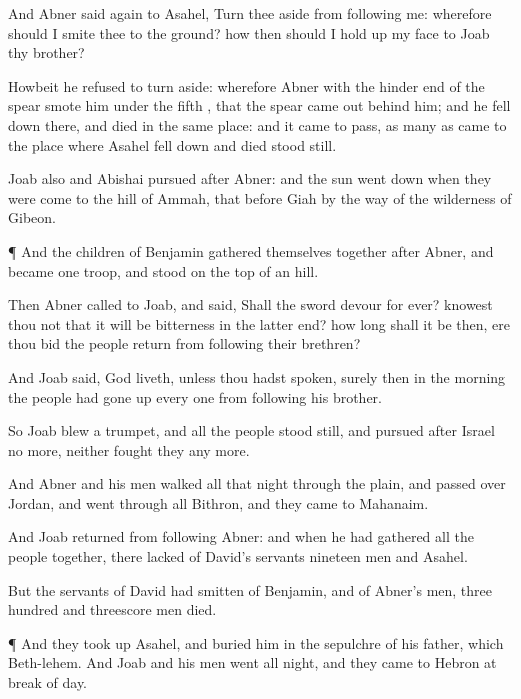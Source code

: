 {And
Abner
said
again to
Asahel, Turn thee
aside from
following me: wherefore should I
smite thee to the
ground? how then should I hold
up my
face to
Joab thy
brother?

Howbeit he
refused to turn
aside: wherefore
Abner with the hinder
end of the
spear
smote him
under the
fifth
{}, that the
spear came
out
behind him; and he fell
down there, and
died in the same
place: and it came to pass,
{} as many as
came to the
place where
Asahel fell
down and
died stood
still.

Joab also and
Abishai
pursued
after
Abner: and the
sun went
down when they were
come to the
hill of
Ammah, that
{}
before
Giah by the
way of the
wilderness of
Gibeon.


\par }{\PP {}¶ And the
children of
Benjamin gathered themselves
together
after
Abner, and became
one
troop, and
stood on the
top of an
hill.

Then
Abner
called to
Joab, and
said, Shall the
sword
devour for
ever?
knowest thou not that it will be
bitterness in the latter
end? how long shall it be then, ere thou
bid the
people
return from
following their
brethren?

And
Joab
said,
{}
God
liveth,
unless thou hadst
spoken, surely then in the
morning the
people had gone
up every
one from
following his
brother.

So
Joab
blew a
trumpet, and all the
people stood
still, and
pursued
after
Israel no more, neither
fought they any
more.

And
Abner and his
men
walked all that
night through the
plain, and passed
over
Jordan, and went
through all
Bithron, and they
came to
Mahanaim.

And
Joab
returned from
following
Abner: and when he had
gathered all the
people
together, there
lacked of
David’s
servants
nineteen
men and
Asahel.

But the
servants of
David had
smitten of
Benjamin, and of
Abner’s
men,
{}
three
hundred and
threescore
men
died.


\par }{\PP {}¶ And they took
up
Asahel, and
buried him in the
sepulchre of his
father, which
{}
Beth-lehem. And
Joab and his
men
went all
night, and they came to
Hebron at break of
day.




}
